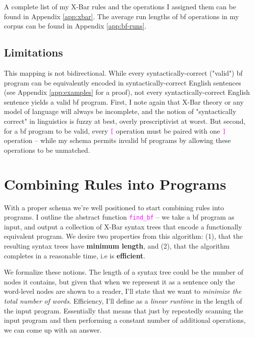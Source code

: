 \documentclass[runningheads]{llncs}
\newcommand{\code}[1]{\texttt{\textcolor{magenta}{\setlength{\fboxsep}{1pt}\colorbox{lightgray!20}{#1}}}}
\begin{document}
A complete list of my X-Bar rules and the operations I assigned them can be found in Appendix \ref{app:xbar}. The average run lengths of bf operations in my corpus can be found in Appendix \ref{app:bf-runs}.

\subsection{Limitations}
This mapping is not bidirectional. While every syntactically-correct ("valid") bf program can be equivalently encoded in syntactically-correct English sentences (see Appendix \ref{app:examples} for a proof), not every syntactically-correct English sentence yields a valid bf program. First, I note again that X-Bar theory or any model of language will always be incomplete, and the notion of "syntactically correct" in linguistics is fuzzy at best, overly prescriptivist at worst. But second, for a bf program to be valid, every \code{[} operation must be paired with one \code{]} operation -- while my schema permits invalid bf programs by allowing these operations to be unmatched.
\section{Combining Rules into Programs}
With a proper schema we're well positioned to start combining rules into programs. I outline the abstract function \code{find\_bf} -- we take a bf program as input, and output a collection of X-Bar syntax trees that encode a functionally equivalent program. We desire two properties from this algorithm: (1), that the resulting syntax trees have \textbf{minimum length}, and (2), that the algorithm completes in a reasonable time, i.e is \textbf{efficient}.

We formalize these notions. The length of a syntax tree could be the number of nodes it contains, but given that when we represent it as a sentence only the word-level nodes are shown to a reader, I'll state that we want to \textit{minimize the total number of words}. Efficiency, I'll define as a \textit{linear runtime} in the length of the input program. Essentially that means that just by repeatedly scanning the input program and then performing a constant number of additional operations, we can come up with an answer.
\end{document}
